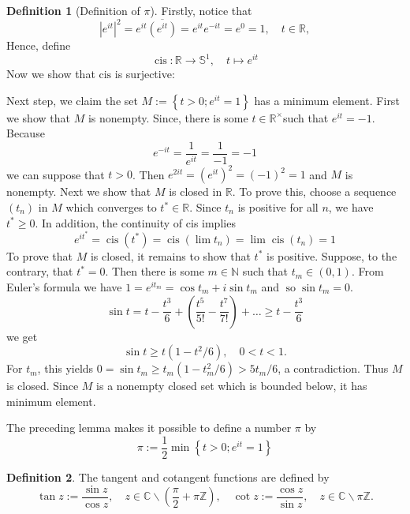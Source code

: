 \documentclass[12pt,a4paper]{book}
\newcommand{\bb}[1]{\mathbb{#1}}
\theoremstyle{definition}
\newtheorem{defn}{Definition}[section]
\begin{document}
\begin{defn}[Definition of $\pi$]
    Firstly, notice that 
    $$
    \left|e^{i t}\right|^2=e^{i t} \overline{\left(e^{i t}\right)}=e^{i t} e^{-i t}=e^0=1, \quad t \in \mathbb{R},
    $$
    Hence, define 
    $$
    \operatorname{cis}: \mathbb{R} \rightarrow \bb{S}^1, \quad t \mapsto e^{i t}
    $$
    Now we show that $\text{cis}$ is surjective: 

    Next step, we claim the set $M:=\left\{t>0 ; e^{i t}=1\right\}$ has a minimum element.
    First we show that $M$ is nonempty. Since, there is some $t \in \mathbb{R}^{\times}$such that $e^{i t}=-1$. Because
    $$
    e^{-i t}=\frac{1}{e^{i t}}=\frac{1}{-1}=-1
    $$
    we can suppose that $t>0$. Then $e^{2 i t}=\left(e^{i t}\right)^2=(-1)^2=1$ and $M$ is nonempty.
    Next we show that $M$ is closed in $\mathbb{R}$. To prove this, choose a sequence $\left(t_n\right)$ in $M$ which converges to $t^* \in \mathbb{R}$. Since $t_n$ is positive for all $n$, we have $t^* \geq 0$. In addition, the continuity of cis implies
    $$
    e^{i t^*}=\operatorname{cis}\left(t^*\right)=\operatorname{cis}\left(\lim t_n\right)=\lim \operatorname{cis}\left(t_n\right)=1
    $$
    To prove that $M$ is closed, it remains to show that $t^*$ is positive. Suppose, to the contrary, that $t^*=0$. Then there is some $m \in \mathbb{N}$ such that $t_m \in(0,1)$. From Euler's formula we have $1=e^{i t_m}=\cos t_m+i \sin t_m$ and $\operatorname{so} \sin t_m=0$.
    $$
    \sin t=t-\frac{t^3}{6}+(\frac{t^5}{5!}-\frac{t^7}{7!})+\dots \ge t-\frac{t^3}{6}
    $$
    we get
    $$
    \sin t \geq t\left(1-t^2 / 6\right), \quad 0<t<1 .
    $$
    For $t_m$, this yields $0=\sin t_m \geq t_m\left(1-t_m^2 / 6\right)>5 t_m / 6$, a contradiction. Thus $M$ is closed.
    Since $M$ is a nonempty closed set which is bounded below, it has minimum element.

    The preceding lemma makes it possible to define a number $\pi$ by
$$
\pi:=\frac{1}{2} \min \left\{t>0 ; e^{i t}=1\right\}
$$
\end{defn}
\begin{defn}
    The tangent and cotangent functions are defined by
    $$
    \tan z:=\frac{\sin z}{\cos z}, \quad z \in \mathbb{C} \backslash\left(\frac{\pi}{2}+\pi \mathbb{Z}\right), \quad \cot z:=\frac{\cos z}{\sin z}, \quad z \in \mathbb{C} \backslash \pi \mathbb{Z} .
    $$
\end{defn}
\end{document}
